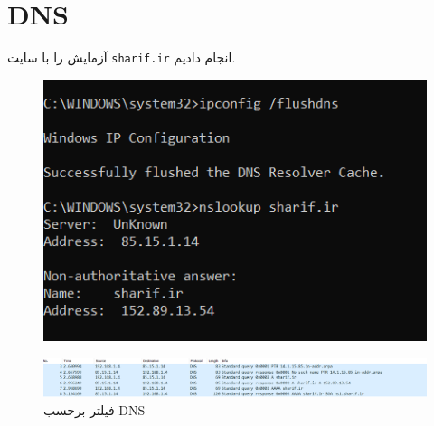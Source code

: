 \documentclass{perassignments}
\begin{document}
	\section{DNS}
	آزمایش را با سایت 
	\texttt{sharif.ir}
	انجام دادیم.
		\begin{figure}[H]
		\centering
		\includegraphics[width= 0.7\linewidth]{graphics/3a.png}
		\caption{}
		\label{fig:3a}
	\end{figure}
	\begin{figure}[H]
	\centering
	\includegraphics[width= 0.7\linewidth]{graphics/3d.png}
	\caption{فیلتر برحسب DNS}
	\label{fig:3d}
\end{figure}
	
\end{document}
